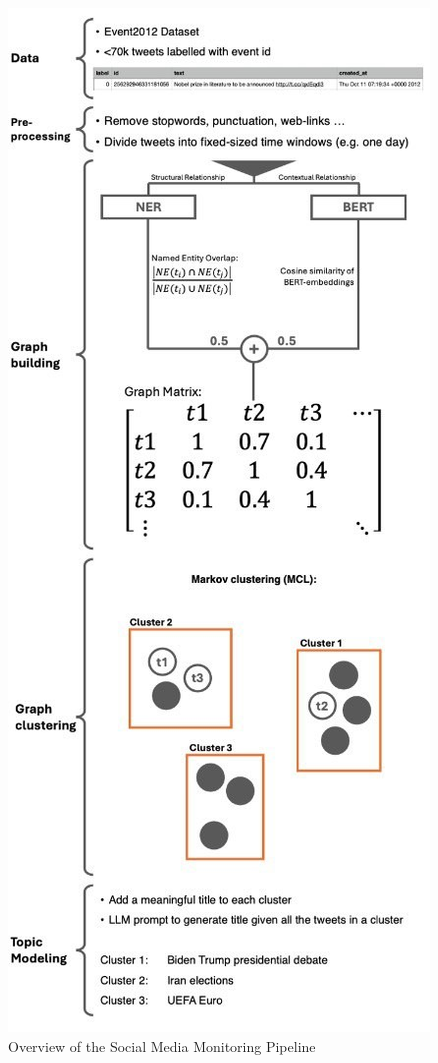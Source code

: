 \begin{figure}[htbp]
    \centering
    \includegraphics[width=0.95\linewidth]{Images/model.jpeg}
    \caption{Overview of the Social Media Monitoring Pipeline}
    \label{fig:model}
\end{figure}

